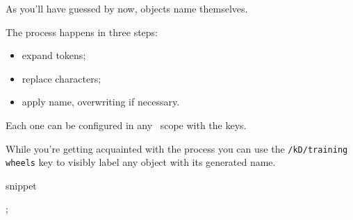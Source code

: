 As you'll have guessed by now, objects name themselves.

The process happens in three steps:
\begin{itemize}[nosep]
  \item expand tokens;
  \item replace characters;
  \item apply name, overwriting if necessary.
\end{itemize}

Each one can be configured in any \koDi\ scope with the keys.

While you're getting acquainted with the process
you can use the \lstinline|/kD/training wheels| key to visibly
label any object with its generated name.

\begin{tcblisting}{snippet}
\begin{kodi}
  ;
\end{kodi}
\end{tcblisting}
